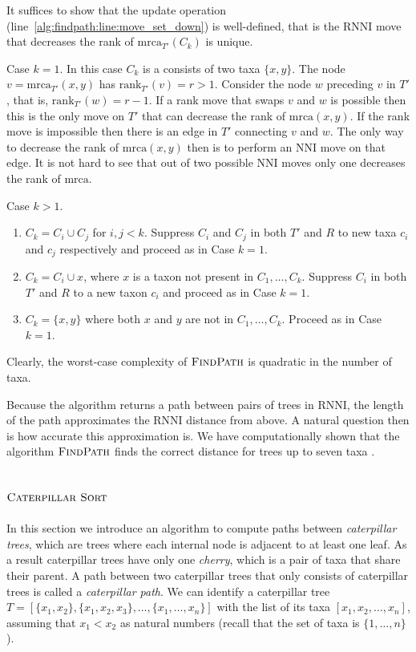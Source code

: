 \documentclass{amsart}
\newcommand{\mrca}{\mathrm{mrca}}
\newcommand{\rank}{\mathrm{rank}}
\newcommand{\nni}{\mathrm{NNI}}
\newcommand{\rnni}{\mathrm{RNNI}}
\newcommand{\csort}{\textsc{Caterpillar Sort}}
\newcommand{\findpath}{\textsc{FindPath}}
\begin{document}
\proof
It suffices to show that the update operation (line~\ref{alg:findpath:line:move_set_down}) is well-defined, that is the $\rnni$ move that decreases the rank of $\mrca_{T'}(C_k)$ is unique.

Case $k = 1$.
In this case $C_k$ is a consists of two taxa $\{x, y\}$.
The node $v = \mrca_{T'}(x, y)$ has $\rank_{T'}(v) = r > 1$.
Consider the node $w$ preceding $v$ in $T'$, that is, $\rank_{T'}(w) = r - 1$.
If a rank move that swaps $v$ and $w$ is possible then this is the only move on $T'$ that can decrease the rank of $\mrca(x, y)$.
If the rank move is impossible then there is an edge in $T'$ connecting $v$ and $w$.
The only way to decrease the rank of $\mrca(x, y)$ then is to perform an $\nni$ move on that edge.
It is not hard to see that out of two possible $\nni$ moves only one decreases the rank of $\mrca$.

Case $k > 1$.
\begin{enumerate}
\item $C_k = C_i \cup C_j$ for $i, j < k$.
Suppress $C_i$ and $C_j$ in both $T'$ and $R$ to new taxa $c_i$ and $c_j$ respectively and proceed as in Case $k = 1$.
\item $C_k = C_i \cup {x}$, where $x$ is a taxon not present in $C_1, \ldots, C_k$.
Suppress $C_i$ in both $T'$ and $R$ to a new taxon $c_i$ and proceed as in Case $k = 1$.
\item $C_k = \{x, y\}$ where both $x$ and $y$ are not in $C_1, \ldots, C_k$.
Proceed as in Case $k = 1$.
\end{enumerate}
\endproof

Clearly, the worst-case complexity of $\findpath$ is quadratic in the number of taxa.

Because the algorithm returns a path between pairs of trees in $\rnni$, the length of the path approximates the $\rnni$ distance from above.
A natural question then is how accurate this approximation is.
We have computationally shown that the algorithm $\findpath$ finds the correct distance for trees up to seven taxa \autocite{Collienne2019}.


\subsection{$\csort$}
\label{section:alg_csort}

In this section we introduce an algorithm to compute paths between \emph{caterpillar trees}, which are trees where each internal node is adjacent to at least one leaf.
As a result caterpillar trees have only one \emph{cherry}, which is a pair of taxa that share their parent.
A path between two caterpillar trees that only consists of caterpillar trees is called a \emph{caterpillar path}.
We can identify a caterpillar tree $T = [\{x_1, x_2\}, \{x_1, x_2, x_3\}, \ldots, \{x_1, \ldots, x_n\}]$ with the list of its taxa $[x_1, x_2, \ldots, x_n]$, assuming that $x_1 < x_2$ as natural numbers (recall that the set of taxa is $\{1, \ldots, n\}$).
\end{document}
